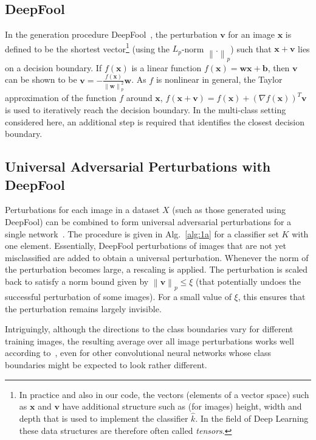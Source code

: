 \documentclass[runningheads]{llncs}
\newcommand{\xb}{\ensuremath{\mathbf{x}}}
\newcommand{\vb}{\ensuremath{\mathbf{v}}}
\begin{document}
\subsection{DeepFool}\label{sec:DeepFool}

In the generation procedure DeepFool~\cite{moosavi-dezfooli_deepfool_2016}, the perturbation \(\mathbf{v}\) for an image \(\xb\) is defined to be the shortest vector\footnote{In practice and also in our code, the vectors (elements of a vector space) such as \(\xb\) and \(\vb\) have additional structure such as (for images) height, width and depth that is used to implement the classifier \(\hat{k}\). In the field of Deep Learning these data structures are therefore often called \emph{tensors}.}
(using the \(L_p\)-norm \(\left\|.\right\|_p\)) such that \(\xb+\mathbf{v}\) lies on a decision boundary. 
If $f(\xb)$ is a linear function $f(\xb)=\mathbf{w} \xb+\mathbf{b}$, then \(\mathbf{v}\) can be shown to be \(\mathbf{v}=-\frac{f(\xb)}{\left\|\mathbf{w}\right\|_p^2}\mathbf{w}\). As \(f\) is nonlinear in general, the Taylor approximation of the function $f$ around \(\mathbf{x}\), \(f(\mathbf{x}+\mathbf{v})=f(\mathbf{x})+\left(\nabla f(\mathbf{x})\right)^T\mathbf{v}\) is used to iteratively reach the decision boundary. 
In the multi-class setting considered here, an additional step is required that identifies the closest decision boundary. 

\subsection{Universal Adversarial Perturbations with DeepFool}

Perturbations for each image in a dataset \(X\) (such as those generated using DeepFool) can be combined to form universal adversarial perturbations for a single network~\cite{moosavidezfooli_universal_2017}. The procedure is given in Alg.~\ref{alg:1a} for a classifier set $K$ with one element. Essentially, DeepFool perturbations of images that are not yet misclassified are added to obtain a universal perturbation. 
Whenever the norm of the perturbation becomes large, a rescaling is applied. The perturbation is scaled back to satisfy a norm bound given by \(\left\|\mathbf{v}\right\|_p\leq\xi\) (that potentially undoes the successful perturbation of some images). For a small value of \(\xi\), this ensures that the perturbation remains largely invisible.

Intriguingly, although the directions to the class boundaries vary for different training images, the resulting average over all image perturbations works well according to~\cite{moosavidezfooli_universal_2017}, even for other convolutional neural networks whose class boundaries might be expected to look rather different. 
\end{document}
